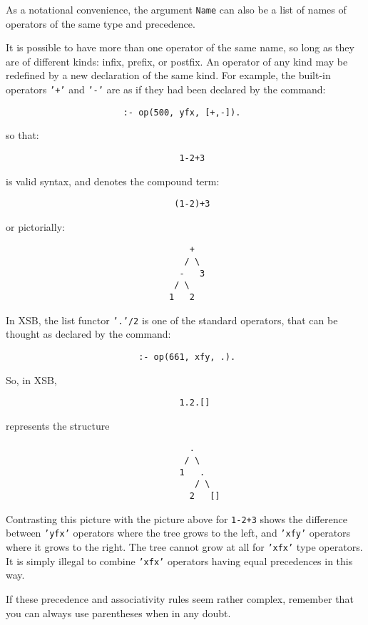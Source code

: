 As a notational convenience, the argument {\tt Name} can also be a list of
names of operators of the same type and precedence.

It is possible to have more than one operator of the same name, so
long as they are of different kinds: infix, prefix, or postfix.  An
operator of any kind may be redefined by a new declaration of the same
kind.  For example, the built-in operators {\tt '+'} and {\tt '-'} are
as if they had been declared by the command:
\begin{verbatim}
                       :- op(500, yfx, [+,-]).
\end{verbatim}
so that:
\begin{verbatim}
                                  1-2+3
\end{verbatim}
is valid syntax, and denotes the compound term:
\begin{verbatim}
                                 (1-2)+3
\end{verbatim}
or pictorially:
\begin{verbatim}
                                    +
                                   / \
                                  -   3
                                 / \
                                1   2
\end{verbatim}

In XSB, the list functor {\tt '.'/2} is one of the standard operators,
that can be thought as declared by the command:
\begin{verbatim}
                          :- op(661, xfy, .).
\end{verbatim}
So, in XSB,
\begin{verbatim}
                                  1.2.[]
\end{verbatim}
represents the structure
\begin{verbatim}
                                    .
                                   / \
                                  1   .
                                     / \
                                    2   []
\end{verbatim}
Contrasting this picture with the picture above for {\tt 1-2+3} shows the
difference between {\tt 'yfx'} operators where the tree grows to the left,
and {\tt 'xfy'} operators where it grows to the right.  The tree cannot
grow at all for {\tt 'xfx'} type operators.  It is simply illegal to combine
{\tt 'xfx'} operators having equal precedences in this way.

If these precedence and associativity rules seem rather complex, remember
that you can always use parentheses when in any doubt.

